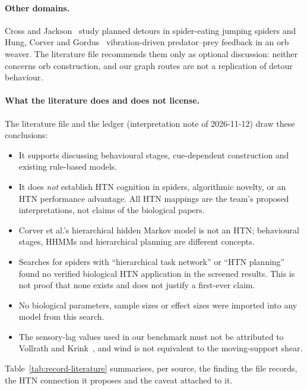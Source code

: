 \paragraph{Other domains.}
Cross and Jackson~\cite{cross2016detours} study planned detours in spider-eating jumping spiders and Hung,
Corver and Gordus~\cite{hung2026feedback} vibration-driven predator--prey feedback in an orb weaver. The
literature file recommends them only as optional discussion: neither concerns orb construction, and our graph
routes are not a replication of detour behaviour.

\paragraph{What the literature does and does not license.}
The literature file and the ledger (interpretation note of 2026-11-12) draw these conclusions:
\begin{itemize}
  \item It supports discussing behavioural stages, cue-dependent construction and existing rule-based models.
  \item It does \emph{not} establish HTN cognition in spiders, algorithmic novelty, or an HTN performance
    advantage. All HTN mappings are the team's proposed interpretations, not claims of the biological papers.
  \item Corver et al.'s hierarchical hidden Markov model is not an HTN; behavioural stages, HHMMs and
    hierarchical planning are different concepts.
  \item Searches for spiders with ``hierarchical task network'' or ``HTN planning'' found no verified
    biological HTN application in the screened results. This is not proof that none exists and does not
    justify a first-ever claim.
  \item No biological parameters, sample sizes or effect sizes were imported into any model from this search.
  \item The sensory-lag values used in our benchmark must not be attributed to Vollrath and
    Krink~\cite{vollrath2020robotics}, and wind is not equivalent to the moving-support shear.
\end{itemize}
Table~\ref{tab:record-literature} summarises, per source, the finding the file records, the HTN connection it
proposes and the caveat attached to it.

